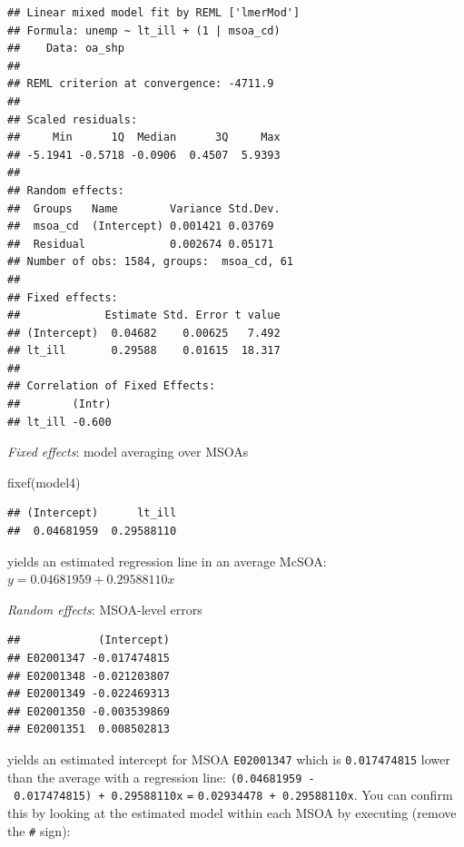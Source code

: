 \documentclass[
]{book}
\newenvironment{Shaded}{\begin{snugshade}}{\end{snugshade}}
\newcommand{\DecValTok}[1]{\textcolor[rgb]{0.00,0.00,0.81}{#1}}
\newcommand{\FunctionTok}[1]{\textcolor[rgb]{0.00,0.00,0.00}{#1}}
\newcommand{\NormalTok}[1]{#1}
\newcommand{\OtherTok}[1]{\textcolor[rgb]{0.56,0.35,0.01}{#1}}
\newcommand{\SpecialCharTok}[1]{\textcolor[rgb]{0.00,0.00,0.00}{#1}}
\begin{document}
\begin{verbatim}
## Linear mixed model fit by REML ['lmerMod']
## Formula: unemp ~ lt_ill + (1 | msoa_cd)
##    Data: oa_shp
## 
## REML criterion at convergence: -4711.9
## 
## Scaled residuals: 
##     Min      1Q  Median      3Q     Max 
## -5.1941 -0.5718 -0.0906  0.4507  5.9393 
## 
## Random effects:
##  Groups   Name        Variance Std.Dev.
##  msoa_cd  (Intercept) 0.001421 0.03769 
##  Residual             0.002674 0.05171 
## Number of obs: 1584, groups:  msoa_cd, 61
## 
## Fixed effects:
##             Estimate Std. Error t value
## (Intercept)  0.04682    0.00625   7.492
## lt_ill       0.29588    0.01615  18.317
## 
## Correlation of Fixed Effects:
##        (Intr)
## lt_ill -0.600
\end{verbatim}

\emph{Fixed effects}: model averaging over MSOAs

\begin{Shaded}
\begin{Highlighting}[]
\FunctionTok{fixef}\NormalTok{(model4)}
\end{Highlighting}
\end{Shaded}

\begin{verbatim}
## (Intercept)      lt_ill 
##  0.04681959  0.29588110
\end{verbatim}

yields an estimated regression line in an average McSOA: \(y = 0.04681959 + 0.29588110x\)

\emph{Random effects}: MSOA-level errors

\begin{Shaded}
\end{Shaded}

\begin{verbatim}
##            (Intercept)
## E02001347 -0.017474815
## E02001348 -0.021203807
## E02001349 -0.022469313
## E02001350 -0.003539869
## E02001351  0.008502813
\end{verbatim}

yields an estimated intercept for MSOA \texttt{E02001347} which is \texttt{0.017474815} lower than the average with a regression line: \texttt{(0.04681959\ -\ 0.017474815)\ +\ 0.29588110x} \texttt{=} \texttt{0.02934478\ +\ 0.29588110x}. You can confirm this by looking at the estimated model within each MSOA by executing (remove the \texttt{\#} sign):
\end{document}
